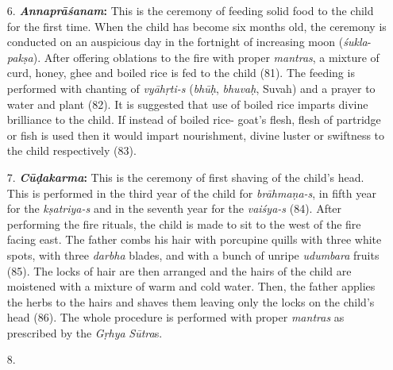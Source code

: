 \begin{enumerate}
\item[6.]
  \textbf{\emph{Annaprāśanam}:} This is the ceremony of feeding solid food to the child for the first time. When the child has become six months old, the ceremony is conducted on an auspicious day in the fortnight of increasing moon (\emph{śukla}-\emph{pakṣa}). After offering oblations to the fire with proper \emph{mantras}, a mixture of curd, honey, ghee and boiled rice is fed to the child (81). The feeding is performed with chanting of \emph{vyāhṛti-s} (\emph{bhūḥ}, \emph{bhuvaḥ}, Suvah) and a prayer to water and plant (82). It is suggested that use of boiled rice imparts divine brilliance to the child. If instead of boiled rice- goat's flesh, flesh of partridge or fish is used then it would impart nourishment, divine luster or swiftness to the child respectively (83).
\item[7.]
  \textbf{\emph{Cūḍakarma}:} This is the ceremony of first shaving of the child's head. This is performed in the third year of the child for \emph{brāhmaṇa-s}, in fifth year for the \emph{kṣatriya-s} and in the seventh year for the \emph{vaiśya-s} (84). After performing the fire rituals, the child is made to sit to the west of the fire facing east. The father combs his hair with porcupine quills with three white spots, with three \emph{darbha} blades, and with a bunch of unripe \emph{udumbara} fruits (85). The locks of hair are then arranged and the hairs of the child are moistened with a mixture of warm and cold water. Then, the father applies the herbs to the hairs and shaves them leaving only the locks on the child's head (86). The whole procedure is performed with proper \emph{mantras} as prescribed by the \emph{Gṛhya} \emph{Sūtra}s.
\item[8.]

\end{enumerate}
